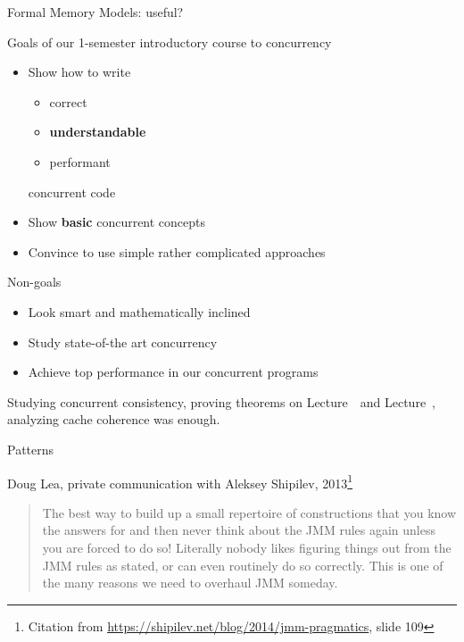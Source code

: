 \begin{frame}[t]{Formal Memory Models: useful?}

Goals of our 1-semester introductory course to concurrency
\begin{itemize}
  \pause
  \item Show how to write
  \begin{itemize}
    \item correct
    \item \textbf{understandable}
    \item performant
  \end{itemize}
  concurrent code

  \pause
  \item Show \textbf{basic} concurrent concepts

  \pause
  \item Convince to use simple rather complicated approaches
\end{itemize}

\pause
Non-goals
\begin{itemize}
  \pause \item Look smart and mathematically inclined
  \pause \item Study state-of-the art concurrency 
  \pause \item Achieve top performance in our concurrent programs
\end{itemize}

\pause

Studying concurrent consistency, proving theorems on Lecture~\foundationsNum \ and Lecture~\foundationsPlusNum, analyzing cache coherence was enough.

\end{frame}

\begin{frame}{Patterns}

Doug Lea, private communication with Aleksey Shipilev, 2013\footnote{\tiny Citation from \url{https://shipilev.net/blog/2014/jmm-pragmatics}, slide 109}

\begin{quote}
The best way to build up a small repertoire of constructions that you know the answers for and then never think about the JMM rules again unless you are forced to do so! Literally nobody likes figuring things out from the JMM rules as stated, or can even routinely do so correctly.
This is one of the many reasons we need to overhaul JMM someday.
\end{quote}
\end{frame}


